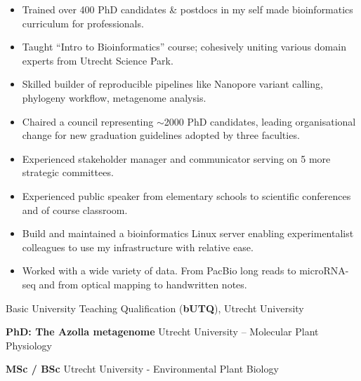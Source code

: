 \documentclass[a4paper,10pt]{article}
\begin{document}
{\begin{adjustbox}{valign=t}
\begin{minipage}[t]{0.6\textwidth}
\begin{itemize}
    \setlength{\itemindent}{0em}
    \setlength{\parindent}{5em}
  \item Trained over 400 PhD candidates \& postdocs in my self made bioinformatics curriculum for professionals.
  \item Taught “Intro to Bioinformatics” course; cohesively uniting various domain experts from Utrecht Science Park.
  \item Skilled builder of reproducible pipelines like Nanopore variant calling, phylogeny workflow, metagenome analysis.
  \item Chaired a council representing $\sim$2000 PhD candidates, leading organisational change for new graduation guidelines adopted by three faculties.
  \item Experienced stakeholder manager and communicator serving on 5 more strategic committees.
  \item Experienced public speaker from elementary schools to scientific conferences and of course classroom.
  \item Build and maintained a bioinformatics Linux server enabling experimentalist colleagues to use my infrastructure with relative ease.
  \item Worked with a wide variety of data. From PacBio long reads to microRNA-seq and from optical mapping to handwritten notes.
\end{itemize}


\end{minipage}%
\end{adjustbox}%
}
\newpage

\begin{description}
  \raggedright
  \item[\normalfont \textcolor{ForestGreen}{\textbf{2022.}}] Basic University Teaching Qualification (\textbf{bUTQ}), Utrecht University
  \item[\normalfont \textcolor{ForestGreen}{\textbf{2017 -- 2022.}}] \textbf{PhD: The Azolla metagenome} Utrecht University – Molecular Plant Physiology
  \item[\normalfont \textcolor{ForestGreen}{\textbf{2010 -- 2017.}}] \textbf{MSc / BSc} Utrecht University - Environmental Plant Biology
\end{description}
\end{document}
